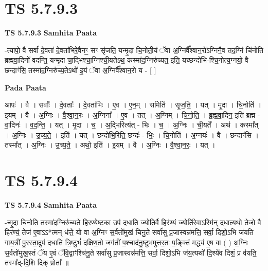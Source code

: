 \documentclass[17pt]{extarticle}
\begin{document}

\section{ TS 5.7.9.3 }

\textbf{TS 5.7.9.3 } \newline
\textbf{Samhita Paata} \newline

-त्यापो॒ वै सर्वा॑ दे॒वता॑ दे॒वता॑भिरे॒वैनꣳ॒॒ सꣳ सृ॑जति॒ यन्मृ॒दा चि॒नोती॒यं ॅवा अ॒ग्निर्वै᳚श्वान॒रो᳚ऽग्निनै॒व तद॒ग्निं चि॑नोति ब्रह्मवा॒दिनो॑ वदन्ति॒ यन्मृ॒दा चा॒द्भिश्चा॒ग्निश्ची॒यतेऽथ॒ कस्मा॑द॒ग्निरु॑च्यत॒ इति॒ यच्छन्दो॑भि-श्चि॒नोत्य॒ग्नयो॒ वै छन्दाꣳ॑सि॒ तस्मा॑द॒ग्निरु॑च्य॒तेऽथो॑ इ॒यं ॅवा अ॒ग्निर्वै᳚श्वान॒रो य - [  ] \newline

\textbf{Pada Paata} \newline

आपः॑ । वै । सर्वाः᳚ । दे॒वताः᳚ । दे॒वता॑भिः । ए॒व । ए॒न॒म् । समिति॑ । सृ॒ज॒ति॒ । यत् । मृ॒दा । चि॒नोति॑ । इ॒यम् । वै । अ॒ग्निः । वै॒श्वा॒न॒रः । अ॒ग्निना᳚ । ए॒व । तत् । अ॒ग्निम् । चि॒नो॒ति॒ । ब्र॒ह्म॒वा॒दिन॒ इति॑ ब्रह्म - वा॒दिनः॑ । व॒द॒न्ति॒ । यत् । मृ॒दा । च॒ । अ॒द्भिरित्य॑त् - भिः । च॒ । अ॒ग्निः । ची॒यते᳚ । अथ॑ । कस्मा᳚त् । अ॒ग्निः । उ॒च्य॒ते॒ । इति॑ । यत् । छन्दो॑भि॒रिति॒ छन्दः॑ - भिः॒ । चि॒नोति॑ । अ॒ग्नयः॑ । वै । छन्दाꣳ॑सि । तस्मा᳚त् । अ॒ग्निः । उ॒च्य॒ते॒ । अथो॒ इति॑ । इ॒यम् । वै । अ॒ग्निः । वै॒श्वा॒न॒रः॒ । यत् ।  \newline





\section{ TS 5.7.9.4 }

\textbf{TS 5.7.9.4 } \newline
\textbf{Samhita Paata} \newline

-न्मृ॒दा चि॒नोति॒ तस्मा॑द॒ग्निरु॑च्यते हिरण्येष्ट॒का उप॑ दधाति॒ ज्योति॒र्वै हिर॑ण्यं॒ ज्योति॑रे॒वाऽस्मि॑न् दधा॒त्यथो॒ तेजो॒ वै हिर॑ण्यं॒ तेज॑ ए॒वाऽऽ*त्मन् ध॑त्ते॒ यो वा अ॒ग्निꣳ स॒र्वतो॑मुखं चिनु॒ते सर्वा॑सु प्र॒जास्वन्न॑मत्ति॒ सर्वा॒ दिशो॒ऽभि ज॑यति गाय॒त्रीं पु॒रस्ता॒दुप॑ दधाति त्रि॒ष्टुभं॑ दक्षिण॒तो जग॑तीं प॒श्चाद॑नु॒ष्टुभ॑मुत्तर॒तः प॒ङ्क्तिं मद्ध्य॑ ए॒ष वा ( ) अ॒ग्निः स॒र्वतो॑मुख॒स्तं ॅय ए॒वं ॅवि॒द्वाꣳश्चि॑नु॒ते सर्वा॑सु प्र॒जास्वन्न॑मत्ति॒ सर्वा॒ दिशो॒ऽभि ज॑य॒त्यथो॑ दि॒श्ये॑व दिशं॒ प्र व॑यति॒ तस्मा᳚द्-दि॒शि दिक् प्रोता᳚ ॥ \newline
\end{document}
